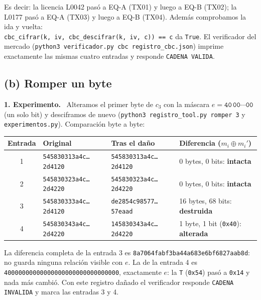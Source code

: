 \documentclass[11pt,letterpaper]{article}
\newcommand{\xor}{\oplus}
\newcommand{\paso}[1]{\par\smallskip\noindent\textbf{#1.}\ }
\begin{document}
Es decir: la licencia L0042 pasó a EQ-A (TX01) y luego a EQ-B (TX02); la L0177 pasó a EQ-A (TX03)
y luego a EQ-B (TX04). Además comprobamos la ida y vuelta:
\\ \texttt{cbc\_cifrar(k, iv, cbc\_descifrar(k, iv, c)) == c} da \texttt{True}.
El verificador del mercado (\texttt{python3 verificador.py cbc registro\_cbc.json}) imprime
exactamente las mismas cuatro entradas y responde \texttt{CADENA VALIDA}.

\subsection*{(b) Romper un byte}

\paso{1. Experimento} Alteramos el primer byte de $c_3$ con la máscara
$e = \texttt{40}\,\texttt{00}\cdots\texttt{00}$ (un solo bit) y desciframos de nuevo
(\texttt{python3 registro\_tool.py romper 3} y \texttt{experimentos.py}). Comparación byte a byte:

\begin{center}
\small
\begin{tabular}{clll}
\toprule
Entrada & Original & Tras el daño & Diferencia ($m_i\xor m_i'$) \\
\midrule
1 & \texttt{545830313a4c\ldots2d4120} & \texttt{545830313a4c\ldots2d4120} & 0 bytes, 0 bits: \textbf{intacta}\\
2 & \texttt{545830323a4c\ldots2d4220} & \texttt{545830323a4c\ldots2d4220} & 0 bytes, 0 bits: \textbf{intacta}\\
3 & \texttt{545830333a4c\ldots2d4120} & \texttt{de2854c98577\ldots57eaad} & 16 bytes, 68 bits: \textbf{destruida}\\
4 & \texttt{545830343a4c\ldots2d4220} & \texttt{145830343a4c\ldots2d4220} & 1 byte, 1 bit (\texttt{0x40}): \textbf{alterada}\\
\bottomrule
\end{tabular}
\end{center}

La diferencia completa de la entrada 3 es
\texttt{8a7064fabf3ba44a683e6bf6827aab8d}: no guarda ninguna relación visible con $e$.
La de la entrada 4 es \texttt{40000000000000000000000000000000}, exactamente $e$:
la \texttt{T} (\texttt{0x54}) pasó a \texttt{0x14} y nada más cambió.
Con este registro dañado el verificador responde \texttt{CADENA INVALIDA} y marca las entradas 3 y 4.
\end{document}
